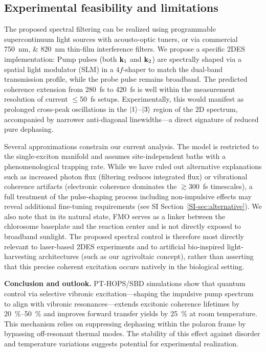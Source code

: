 \documentclass[journal=jpcl,manuscript=letter]{achemso}
\begin{document}
\subsection*{Experimental feasibility and limitations}

The proposed spectral filtering can be realized using programmable supercontinuum light sources with acousto-optic tuners,\cite{Gunthardt2023} or via commercial \SIlist{750;820}{\nano\meter} thin-film interference filters. We propose a specific 2DES implementation:\cite{Sebastian2024} Pump pulses (both $\vb{k}_1$ and $\vb{k}_2$) are spectrally shaped via a spatial light modulator (SLM) in a $4f$-shaper to match the dual-band transmission profile, while the probe pulse remains broadband.
The predicted coherence extension from \SI{280}{\femto\second} to \SI{420}{\femto\second} is well within the measurement resolution of current $\leq$\SI{50}{\femto\second} setups.\cite{Engel2007} Experimentally, this would manifest as prolonged cross-peak oscillations in the $\ket{1}$--$\ket{3}$ region of the 2D spectrum, accompanied by narrower anti-diagonal linewidths—a direct signature of reduced pure dephasing. 

Several approximations constrain our current analysis. The model is restricted to the single-exciton manifold and assumes site-independent baths with a phenomenological trapping rate. While we have ruled out alternative explanations such as increased photon flux (filtering reduces integrated flux) or vibrational coherence artifacts (electronic coherence dominates the $\gtrsim$\SI{300}{\femto\second} timescales), a full treatment of the pulse-shaping process including non-impulsive effects may reveal additional fine-tuning requirements (see SI Section~\ref{SI-sec:alternative}). We also note that in its natural state, FMO serves as a linker between the chlorosome baseplate and the reaction center and is not directly exposed to broadband sunlight.\cite{Blankenship2011} The proposed spectral control is therefore most directly relevant to laser-based 2DES experiments and to artificial bio-inspired light-harvesting architectures (such as our agrivoltaic concept), rather than asserting that this precise coherent excitation occurs natively in the biological setting.

\textbf{Conclusion and outlook.}
PT-HOPS/SBD simulations show that quantum control via selective vibronic excitation---shaping the impulsive pump spectrum to align with vibronic resonances---extends excitonic coherence lifetimes by \SIrange{20}{50}{\percent} and improves forward transfer yields by \SI{25}{\percent} at room temperature. This mechanism relies on suppressing dephasing within the polaron frame by bypassing off-resonant thermal modes. The stability of this effect against disorder and temperature variations suggests potential for experimental realization.
\end{document}
